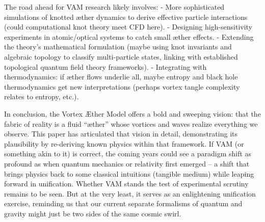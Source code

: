 \documentclass[preprint]{revtex4-2}
\begin{document}
    The road ahead for VAM research likely involves:
    - More sophisticated simulations of knotted æther dynamics to derive effective particle interactions (could computational knot theory meet CFD here).
    - Designing high-sensitivity experiments in atomic/optical systems to catch small æther effects.
    - Extending the theory’s mathematical formulation (maybe using knot invariants and algebraic topology to classify multi-particle states, linking with established topological quantum field theory frameworks).
    - Integrating with thermodynamics: if æther flows underlie all, maybe entropy and black hole thermodynamics get new interpretations (perhaps vortex tangle complexity relates to entropy, etc.).

    In conclusion, the Vortex Æther Model offers a bold and sweeping vision: that the fabric of reality is a fluid “æther” whose vortices and waves realize everything we observe. This paper has articulated that vision in detail, demonstrating its plausibility by re-deriving known physics within that framework. If VAM (or something akin to it) is correct, the coming years could see a paradigm shift as profound as when quantum mechanics or relativity first emerged – a shift that brings physics back to some classical intuitions (tangible medium) while leaping forward in unification. Whether VAM stands the test of experimental scrutiny remains to be seen. But at the very least, it serves as an enlightening unification exercise, reminding us that our current separate formalisms of quantum and gravity might just be two sides of the same cosmic swirl.

        {\scriptsize
        }
\end{document}
